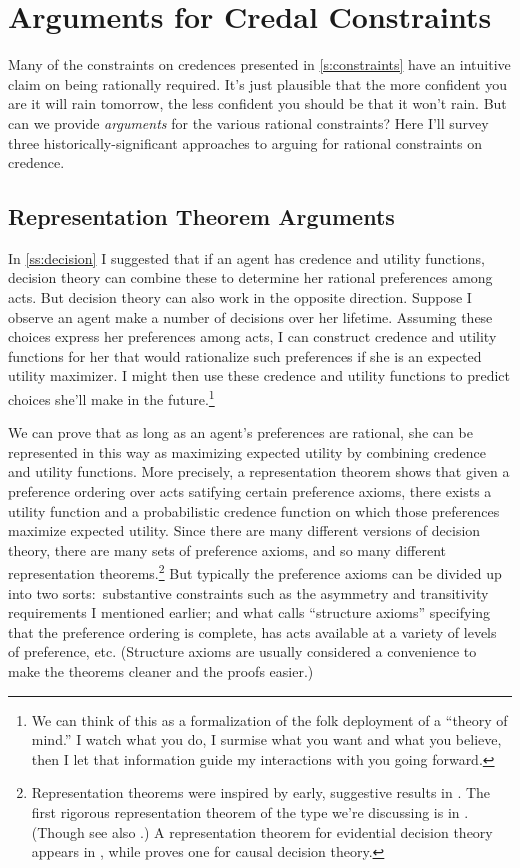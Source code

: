 \section{Arguments for Credal Constraints}
Many of the constraints on credences presented in \autoref{s:constraints} have an intuitive claim on being rationally required. It's just plausible that the more confident you are it will rain tomorrow, the less confident you should be that it won't rain. But can we provide \emph{arguments} for the various rational constraints? Here I'll survey three historically-significant approaches to arguing for rational constraints on credence.

\subsection{Representation Theorem Arguments} \label{ss:representation}
In \autoref{ss:decision} I suggested that if an agent has credence and utility functions, decision theory can combine these to determine her rational preferences among acts. But decision theory can also work in the opposite direction. Suppose I observe an agent make a number of decisions over her lifetime. Assuming these choices express her preferences among acts, I can construct credence and utility functions for her that would rationalize such preferences if she is an expected utility maximizer. I might then use these credence and utility functions to predict choices she'll make in the future.\footnote
{We can think of this as a formalization of the folk deployment of a ``theory of mind.'' I watch what you do, I surmise what you want and what you believe, then I let that information guide my interactions with you going forward.}

We can prove that as long as an agent's preferences are rational, she can be represented in this way as maximizing expected utility by combining credence and utility functions. More precisely, a representation theorem shows that given a preference ordering over acts satifying certain preference axioms, there exists a utility function and a probabilistic credence function on which those preferences maximize expected utility. Since there are many different versions of decision theory, there are many sets of preference axioms, and so many different representation theorems.\footnote
{Representation theorems were inspired by early, suggestive results in \citet{RamseyTruth}. The first rigorous representation theorem of the type we're discussing is in \citet{SavageFoundations}. (Though see also \citealp{vonNeumannMorgenstern}.) A representation theorem for evidential decision theory appears in \citet{JeffreyLogic}, while \citet{JoyceCausal} proves one for causal decision theory.}
 But typically the preference axioms can be divided up into two sorts:\ substantive constraints such as the asymmetry and transitivity requirements I mentioned earlier; and what \citet{SuppesMetaphysics} calls ``structure axioms'' specifying that the preference ordering is complete, has acts available at a variety of levels of preference, etc. (Structure axioms are usually considered a convenience to make the theorems cleaner and the proofs easier.)

